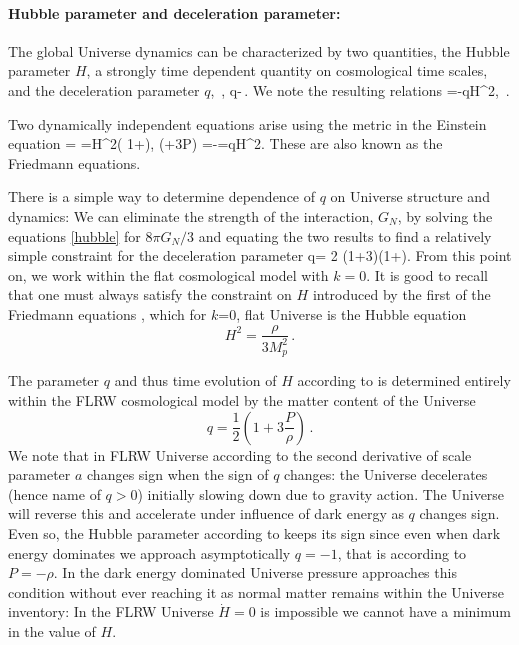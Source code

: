 {%
\paragraph{Hubble parameter and deceleration parameter:}
The global Universe dynamics can be characterized by two quantities, the Hubble parameter $H$, a strongly time dependent quantity on cosmological time scales, and the deceleration parameter $q$,
\beqn\label{dynamic}
\,, 
\eeqn
\beqn\label{dynamic1}
q\equiv -\,.
\eeqn
We note the resulting relations
\beqn\label{eq:Hdot1}
 =-qH^2,
 \eeqn
\beqn\label{eq:Hdot}
 \,. 
\eeqn

Two dynamically independent equations arise using the metric  in the Einstein equation 
\beqn\label{hubble}
 \rho = 
=H^2\left( 1+\right),
\qquad
{} (\rho+3P) =-=qH^2.
\eeqn
These are also known as the Friedmann equations. 

There is a simple way to determine dependence of $q$ on Universe structure and dynamics: We can eliminate the strength of the interaction, $G_N$, by solving the equations \eqref{hubble} for ${8\pi G_N}/{3}$ and equating the two results to find a relatively simple constraint for the deceleration parameter
\beqn\label{qparam0}
q= 2 \left(1+3\right)\left(1+\right).
\eeqn
From this point on, we work within the flat cosmological model with $k=0$. It is good to recall that one must always satisfy the constraint on $H$ introduced by the first of the Friedmann equations , which for $k$=0, flat Universe is the Hubble equation
\begin{equation}\label{Hubble_eq}
H^2=\frac{\rho}{3M_p^2}\,.
\end{equation}

The parameter $q$ and thus time evolution of $H$ according to  is determined entirely within the FLRW cosmological model by the matter content of the Universe
\begin{equation}\label{qparam}
\boxed{q=\frac 1 2 \left(1+3\frac{P}{\rho}\right)}\,.
\end{equation}
We note that in FLRW  Universe  according to  the second derivative of scale parameter $a$ changes sign when the sign of $q$ changes: the  Universe decelerates (hence name of $q>0$) initially slowing down due to gravity action. The Universe will reverse this and accelerate under influence of dark energy as $q$ changes sign. Even so, the Hubble parameter according to   keeps its sign since even when dark energy dominates we approach asymptotically $q=-1$, that is  according to   $P=-\rho$. In the dark energy dominated Universe pressure approaches this condition without ever reaching it as normal matter remains within the Universe inventory: In the FLRW Universe $\dot H=0$ is impossible we cannot have a minimum in the value of $H$. 

}
